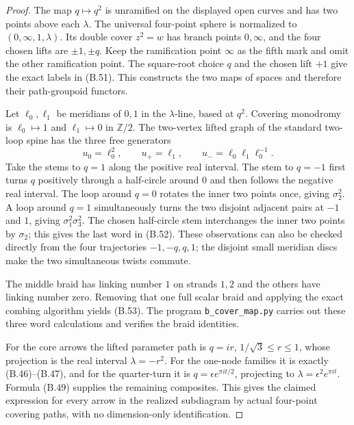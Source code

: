 \begin{proof}
The map $q\mapsto q^2$ is unramified on the displayed
open curves and has two points above each $\lambda$.
The universal four-point sphere is normalized to
$(0,\infty,1,\lambda)$.  Its double cover $z^2=w$
has branch points $0,\infty$, and the four chosen lifts
are $\pm1,\pm q$.  Keep the ramification point $\infty$
as the fifth mark and omit the other ramification point.
The square-root choice $q$ and the chosen lift $+1$ give
the exact labels in (B.51).  This constructs the two
maps of spaces and therefore their path-groupoid functors.

Let $\ell_0,\ell_1$ be meridians of $0,1$ in the
$\lambda$-line, based at $q^2$.  Covering monodromy is
$\ell_0\mapsto1$ and $\ell_1\mapsto0$ in $\mathbb Z/2$.
The two-vertex lifted graph of the standard two-loop
spine has the three free generators
\[
 u_0=\ell_0^2,\qquad u_+=\ell_1,\qquad
 u_-=\ell_0\ell_1\ell_0^{-1}.
\]
Take the stems to $q=1$ along the positive real interval.
The stem to $q=-1$ first turns $q$ positively through a
half-circle around $0$ and then follows the negative
real interval.  The loop around $q=0$ rotates the inner
two points once, giving $\sigma_2^2$.  A loop around
$q=1$ simultaneously turns the two disjoint adjacent
pairs at $-1$ and $1$, giving
$\sigma_1^2\sigma_3^2$.  The chosen half-circle stem
interchanges the inner two points by $\sigma_2$; this
gives the last word in (B.52).  These observations can
also be checked directly from the four trajectories
$-1,-q,q,1$; the disjoint small meridian discs make the
two simultaneous twists commute.

The middle braid has linking number $1$ on strands
$1,2$ and the others have linking number zero.  Removing
that one full scalar braid and applying the exact combing
algorithm yields (B.53).  The program
\texttt{b\_cover\_map.py} carries out these three word
calculations and verifies the braid identities.

For the core arrows the lifted parameter path is
$q=ir$, $1/\sqrt3\leq r\leq1$, whose projection is
the real interval $\lambda=-r^2$.
For the one-node families it is exactly (B.46)--(B.47),
and for the quarter-turn it is
$q=\epsilon e^{\pi it/2}$, projecting to
$\lambda=\epsilon^2e^{\pi it}$.  Formula (B.49)
supplies the remaining composites.  This gives the
claimed expression for every arrow in the realized
subdiagram by actual four-point covering paths,
with no dimension-only identification.
\end{proof}
